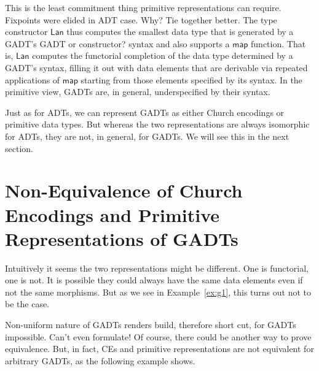 \documentclass[acmsmall,screen,review,anonymous]{acmart}
\theoremstyle{definition}
\begin{document}
{\color{blue} This is the least commitment
  thing primitive representations can require. Fixpoints were elided
  in ADT case. Why? Tie together better.}  The type constructor
$\mathsf{Lan}$ thus computes the smallest data type that is generated
by a GADT's {\color{blue} GADT or constructor?} syntax and also
supports a $\mathsf{map}$ function. That is, $\mathsf{Lan}$ computes
the functorial completion of the data type determined by a GADT's
syntax, filling it out with data elements that are derivable via
repeated applications of $\mathsf{map}$ starting from those elements
specified by its syntax. In the primitive view, GADTs are, in general,
underspecified by their syntax.

Just as for ADTs, we can represent GADTs as either Church encodings or
primitive data types. But whereas the two representations are always
isomorphic for ADTs, they are not, in general, for GADTs. We will see
this in the next section.

\section{Non-Equivalence of Church Encodings and Primitive
  Representations of GADTs}\label{sec:non-equiv}

Intuitively it seems the two representations might be different. One
is functorial, one is not. It is possible they could always have the
same data elements even if not the same morphisms. But as we see in
Example~\ref{ex:g1}, this turns out not to be the case.

Non-uniform nature of GADTs renders build, therefore short cut, for
GADTs impossible. Can't even formulate! Of course, there could be
another way to prove equivalence.  But, in fact, CEs and primitive
representations are not equivalent for arbitrary GADTs, as the
following example shows.
\end{document}
